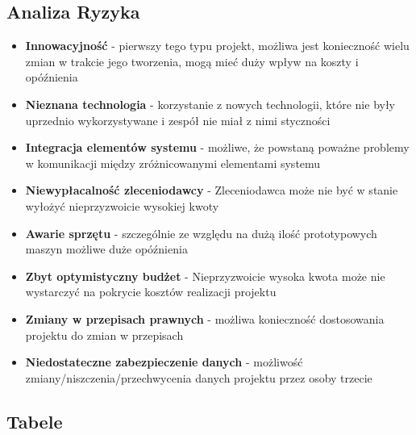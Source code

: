\documentclass[12pt]{article}
\begin{document}
\subsection{Analiza Ryzyka}
\begin{itemize}
\item \textbf{Innowacyjność} - pierwszy tego typu projekt, możliwa jest konieczność wielu zmian w trakcie jego tworzenia, mogą mieć duży wpływ na koszty i opóźnienia
\item \textbf{Nieznana technologia} - korzystanie z nowych technologii, które nie były uprzednio wykorzystywane i zespół nie miał z nimi styczności
\item \textbf{Integracja elementów systemu} - możliwe, że powstaną poważne problemy w komunikacji między zróżnicowanymi elementami systemu
\item \textbf{Niewypłacalność zleceniodawcy} - Zleceniodawca może nie być w stanie wyłożyć nieprzyzwoicie wysokiej kwoty
\item \textbf{Awarie sprzętu} - szczególnie ze względu na dużą ilość prototypowych maszyn możliwe duże opóźnienia
\item \textbf{Zbyt optymistyczny budżet} - Nieprzyzwoicie wysoka kwota może nie wystarczyć na pokrycie kosztów realizacji projektu
\item \textbf{Zmiany w przepisach prawnych} - możliwa konieczność dostosowania projektu do zmian w przepisach
\item \textbf{Niedostateczne zabezpieczenie danych} - możliwość zmiany/niszczenia/przechwycenia danych projektu przez osoby trzecie
\end{itemize}
\subsection{Tabele}
\end{document}

